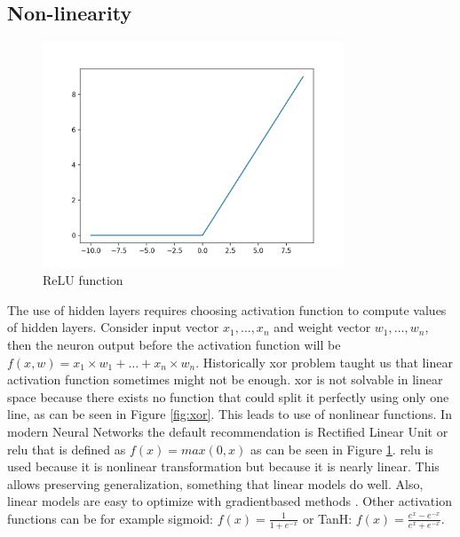 \documentclass[thesis=B,english]{FITthesis}[2019/12/23]
\begin{document}
\subsection{Non-linearity}
\begin{figure}
    \centering
    \includegraphics[width=0.8\textwidth]{relu.png}
    \caption[ReLU function]{ReLU function \cite{relu}}
    \label{fig:relu}
\end{figure}
    The use of hidden layers requires choosing activation function to compute values of hidden layers. Consider input vector $x_1, \ldots, x_n$ and weight vector $w_1, \ldots, w_n$, then the neuron output before the activation function will be $f(x, w) = x_1 \times w_1 + \ldots + x_n \times w_n$. Historically \gls{xor} problem taught us that linear activation function sometimes might not be enough. \gls{xor} is not solvable in linear space because there exists no function that could split it perfectly using only one line, as can be seen in Figure \ref{fig:xor}. This leads to use of nonlinear functions. In modern Neural Networks the default recommendation is Rectified Linear Unit or \gls{relu} that is defined as $f(x) = max(0, x)$ as can be seen in Figure \ref{fig:relu}. \Gls{relu} is used because it is nonlinear transformation but because it is nearly linear. This allows preserving generalization, something that linear models do well. Also, linear models are easy to optimize with gradientbased methods \cite{bengio2017deep}. Other activation functions can be for example  sigmoid: $f(x) = \frac{1}{1+e^{-x}}$ or TanH: $f(x) = \frac{e^x - e^{-x}}{e^x + e^{-x}}$. 
    
\end{document}
